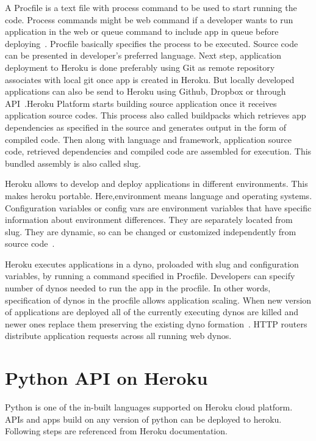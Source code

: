  A Procfile is a text file with 
 process command to be used to start running the code. Process commands might
 be web command if a developer wants to run application in the web or queue
 command to include app in queue before deploying~\cite{hid-sp18-415-www-how-heroku-works}.
 Procfile basically specifies the process to be executed.
 Source code can be presented in developer's preferred language.
 Next step, application deployment to Heroku is done preferably using Git
 as remote repository associates with local git  once app is created in Heroku.
 But locally developed applications can also be send to Heroku using Github,
 Dropbox or through API~\cite{hid-sp18-415-www-how-heroku-works}.Heroku Platform starts 
 building source application once it receives application source codes. This 
 process also called buildpacks which retrieves app dependencies as specified 
 in the source and generates output in the form of compiled code. Then along
 with language and framework, application source code, retrieved dependencies
 and compiled code are assembled for execution. This bundled assembly is also
 called slug.

 Heroku allows to develop and deploy applications in different environments.
 This makes heroku portable. Here,environment means language and operating
 systems. Configuration variables or config vars are environment variables
 that have specific information about environment differences. They are
 separately located from slug. They are dynamic, so can be changed or
 customized independently from source code~\cite{hid-sp18-415-www-how-heroku-works}.

 Heroku executes applications in a dyno, proloaded with slug and configuration
 variables, by running a command specified in Procfile. Developers can specify
 number of dynos needed to run the app in the procfile. In other words,
 specification of dynos in the procfile allows application scaling. When new
 version of applications are deployed all of the currently executing dynos are
 killed and newer ones replace them preserving the existing dyno
 formation~\cite{hid-sp18-415-www-how-heroku-works}. HTTP routers distribute application
 requests across all running web dynos. 


\section{Python API on Heroku}

 Python is one of the in-built languages supported on Heroku cloud platform.
 APIs and apps build on any version of python can be deployed to heroku.
 Following steps are referenced from Heroku documentation. 

